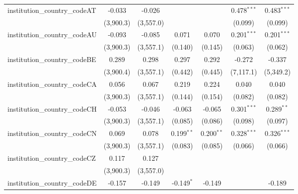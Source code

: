 \begin{tabular}{lcccccc}
   institution\_country\_codeAT          & -0.033         & -0.026         &               &               & 0.478$^{***}$  & 0.483$^{***}$\\   
                                         & (3,900.3)      & (3,557.0)      &               &               & (0.099)        & (0.099)\\   
   institution\_country\_codeAU          & -0.093         & -0.085         & 0.071         & 0.070         & 0.201$^{***}$  & 0.201$^{***}$\\   
                                         & (3,900.3)      & (3,557.1)      & (0.140)       & (0.145)       & (0.063)        & (0.062)\\   
   institution\_country\_codeBE          & 0.289          & 0.298          & 0.297         & 0.292         & -0.272         & -0.337\\   
                                         & (3,900.4)      & (3,557.1)      & (0.442)       & (0.445)       & (7,117.1)      & (5,349.2)\\   
   institution\_country\_codeCA          & 0.056          & 0.067          & 0.219         & 0.224         & 0.040          & 0.040\\   
                                         & (3,900.3)      & (3,557.1)      & (0.144)       & (0.154)       & (0.082)        & (0.082)\\   
   institution\_country\_codeCH          & -0.053         & -0.046         & -0.063        & -0.065        & 0.301$^{***}$  & 0.289$^{**}$\\   
                                         & (3,900.3)      & (3,557.1)      & (0.085)       & (0.086)       & (0.098)        & (0.097)\\   
   institution\_country\_codeCN          & 0.069          & 0.078          & 0.199$^{**}$  & 0.200$^{**}$  & 0.328$^{***}$  & 0.326$^{***}$\\   
                                         & (3,900.3)      & (3,557.1)      & (0.083)       & (0.085)       & (0.066)        & (0.066)\\   
   institution\_country\_codeCZ          & 0.117          & 0.127          &               &               &                &   \\   
                                         & (3,900.3)      & (3,557.0)      &               &               &                &   \\   
   institution\_country\_codeDE          & -0.157         & -0.149         & -0.149$^{*}$  & -0.149        &                & -0.189\\   

\end{tabular}
